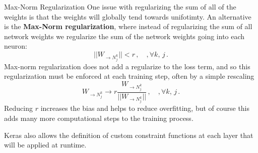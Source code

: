 \documentclass[10pt, table, dvipsnames,xcdraw,handout]{beamer}
\begin{document}
\begin{frame}[fragile]{Max-Norm Regularization}
One issue with regularizing the sum of all of the weights is that the weights will globally tend towards unifotimty. An alternative is the \textbf{Max-Norm regularization}, where instead of regularizing the sum of all network weights we regularize the sum of the network weights going into each neuron:
$$
||W_{\to N^k_j}|| <r\,,\hspace{1em}, \forall k,\,j\,.
$$ \pause
Max-norm regularization does not add a regularize to the loss term, and so this regularization must be enforced at each training step, often by a simple rescaling
$$
W_{\to N^k_j}\to r \frac{W_{\to N^k_j}}{||W_{\to N^k_j}||}\,,\hspace{1em}, \forall k,\,j\,.
$$ 
Reducing $r$ increases the bias and helps to reduce overfitting, but of course this adds many more computational steps to the training process. \pause

Keras also allows the definition of custom constraint functions at each layer that will be applied at runtime. 
\end{frame}
\end{document}
